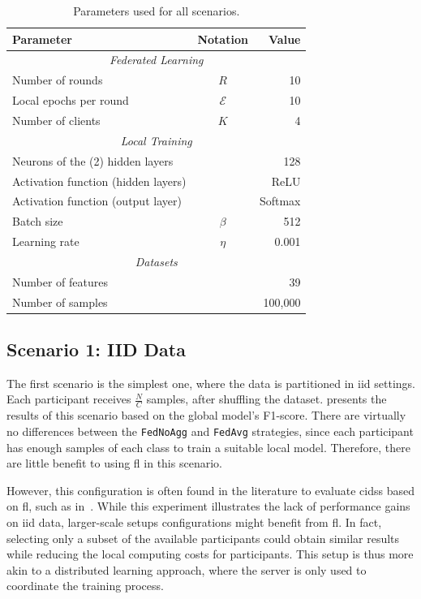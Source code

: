 \begin{table}
  \centering
  \caption{Parameters used for all scenarios.}
  \label{tbl:parameters}
  \begin{tabular}{lcr}
     \toprule
      \textbf{Parameter} & \textbf{Notation} & \textbf{Value} \\
      \midrule
      \multicolumn{3}{c}{\emph{Federated Learning}} \\
      \midrule
      Number of rounds & $R$ & 10 \\
      Local epochs per round & $\mathcal{E}$ & 10 \\
      Number of clients & $K$ & 4 \\
      \midrule
      \multicolumn{3}{c}{\emph{Local Training}} \\
      \midrule
      Neurons of the (2) hidden layers &  & 128 \\
      Activation function (hidden layers) &  & ReLU \\
      Activation function (output layer) &  & Softmax \\
      Batch size & $\beta$ & 512 \\
      Learning rate & $\eta$ & 0.001 \\
      \midrule
      \multicolumn{3}{c}{\emph{Datasets}} \\
      \midrule
      Number of features &  & 39 \\
      Number of samples &  & 100,000 \\
      \bottomrule
  \end{tabular}
\end{table}

\subsection{Scenario 1: IID Data\label{sec:demo.iid}}

The first scenario is the simplest one, where the data is partitioned in \gls{iid} settings.
Each participant receives $\frac{N}{C}$ samples, after shuffling the dataset.
 presents the results of this scenario based on the global model's F1-score. 
There are virtually no differences between the \texttt{FedNoAgg} and \texttt{FedAvg} strategies, since each participant has enough samples of each class to train a suitable local model.
Therefore, there are little benefit to using \gls{fl} in this scenario.

However, this configuration is often found in the literature to evaluate \glspl{cids} based on \gls{fl}, such as in~\cite{aouedi_IntrusiondetectionSoftwarized_2022}. %
While this experiment illustrates the lack of performance gains on \gls{iid} data, larger-scale setups configurations might benefit from \gls{fl}.
In fact, selecting only a subset of the available participants could obtain similar results while reducing the local computing costs for participants.
This setup is thus more akin to a distributed learning approach, where the server is only used to coordinate the training process.

